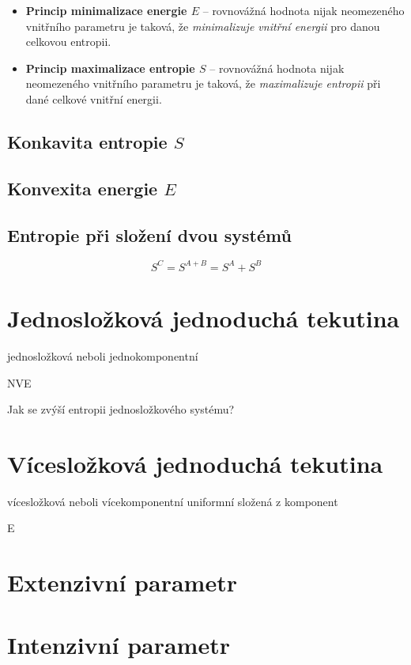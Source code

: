 \begin{itemize}

\item \textbf{Princip minimalizace energie $E$} -- rovnovážná hodnota nijak neomezeného vnitřního parametru je taková, že \textit{minimalizuje vnitřní energii} pro danou celkovou entropii.

\item \textbf{Princip maximalizace entropie $S$} -- rovnovážná hodnota nijak neomezeného vnitřního parametru je taková, že \textit{maximalizuje entropii} při dané celkové vnitřní energii.

\end{itemize}

\subsection{Konkavita entropie $S$}

\subsection{Konvexita energie $E$}

\subsection{Entropie při složení dvou systémů}

$$
S^C = S^{A + B} = S^A + S^B 
$$

\section{Jednosložková jednoduchá tekutina}
jednosložková neboli jednokomponentní

NVE

Jak se zvýší entropii jednosložkového systému?

\section{Vícesložková jednoduchá tekutina}
vícesložková neboli vícekomponentní uniformní složená z komponent

E

\section{Extenzivní parametr}

\section{Intenzivní parametr}


